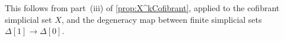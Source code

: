 \documentclass[reqno,10pt,a4paper,oneside,draft]{amsart}
\makeatletter
\renewenvironment{proof}[1][\proofname] {\par\pushQED{\qed}\normalfont\topsep6\p@\@plus6\p@\relax\trivlist\item[\hskip\labelsep\bf#1\@addpunct{.}]\ignorespaces}{\popQED\endtrivlist\@endpefalse}
\numberwithin{equation}{section}
\theoremstyle{mythm}
\theoremstyle{mydef}
\theoremstyle{myrmk}
\newcommand{\ie}{\text{i.e.\ }}
\newcommand{\Path}{\mathsf{Path}}
\makeatother
\begin{document}
\begin{proof}
This follows from part~(iii) of \cref{prop:X^kCofibrant}, applied to the cofibrant simplicial set $X$, and the degeneracy map between finite simplicial sets $\Delta[1] \rightarrow \Delta[0]$. 
\end{proof}






\end{document}
